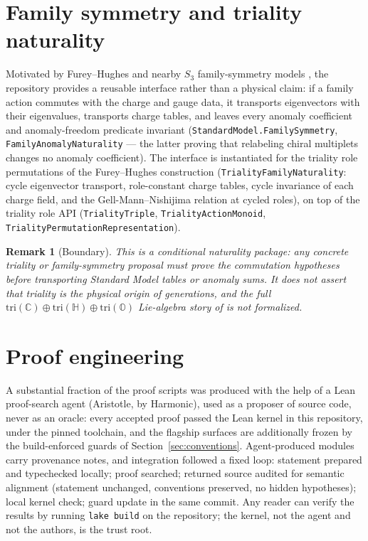 \documentclass[11pt]{article}
\newcommand{\C}{\mathbb{C}}
\newcommand{\OO}{\mathbb{O}}
\newcommand{\leanname}[1]{\texttt{#1}}
\newtheorem{remark}{Remark}
\begin{document}
\section{Family symmetry and triality naturality}
\label{sec:family}

Motivated by Furey--Hughes \cite{FureyHughes2025} and nearby $S_3$
family-symmetry models \cite{Gresnigt2026}, the repository provides a
reusable interface rather than a physical claim: if a family action
commutes with the charge and gauge data, it transports eigenvectors with
their eigenvalues, transports charge tables, and leaves every anomaly
coefficient and anomaly-freedom predicate invariant
(\leanname{StandardModel.FamilySymmetry},
\leanname{FamilyAnomalyNaturality} --- the latter proving that
relabeling chiral multiplets changes no anomaly coefficient).  The
interface is instantiated for the triality role permutations of the
Furey--Hughes construction
(\leanname{TrialityFamilyNaturality}: cycle eigenvector transport,
role-constant charge tables, cycle invariance of each charge field, and
the Gell-Mann--Nishijima relation at cycled roles), on top of the
triality role API (\leanname{TrialityTriple},
\leanname{TrialityActionMonoid},
\leanname{TrialityPermutationRepresentation}).

\begin{remark}[Boundary]
This is a conditional naturality package: any concrete triality or
family-symmetry proposal must \emph{prove} the commutation hypotheses
before transporting Standard Model tables or anomaly sums.  It does not
assert that triality is the physical origin of generations, and the full
$\mathrm{tri}(\C)\oplus\mathrm{tri}(\mathbb{H})\oplus\mathrm{tri}(\OO)$
Lie-algebra story of \cite{FureyHughes2025} is not formalized.
\end{remark}

\section{Proof engineering}
\label{sec:eng}

A substantial fraction of the proof scripts was produced with the help of
a Lean proof-search agent (Aristotle, by Harmonic), used as a proposer of
source code, never as an oracle: every accepted proof passed the Lean
kernel in this repository, under the pinned toolchain, and the flagship
surfaces are additionally frozen by the build-enforced guards of
Section~\ref{sec:conventions}.  Agent-produced modules carry provenance
notes, and integration followed a fixed loop: statement prepared and
typechecked locally; proof searched; returned source audited for
semantic alignment (statement unchanged, conventions preserved, no
hidden hypotheses); local kernel check; guard update in the same commit.
Any reader can verify the results by running \leanname{lake build} on the
repository; the kernel, not the agent and not the authors, is the trust
root.
\end{document}
